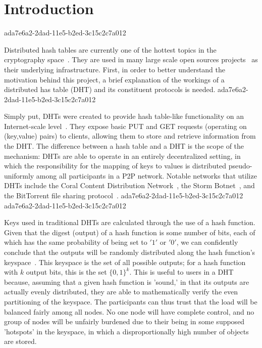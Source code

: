 \documentclass[12pt]{article}
\begin{document}
\section{Introduction}
ada7e6a2-2dad-11e5-b2ed-3c15c2c7a012\par Distributed hash tables are currently one of the hottest topics in the cryptography space~\cite{Stoica:2001dj,Rowstron:2001ea,Ratnasamy:2001wn}. They are used in many large scale open sources projects~\cite{Freitas:2013tb,Xu:2010vs,Perfitt:2010fh} as their underlying infrastructure. First, in order to better understand the motivation behind this project, a brief explanation of the workings of a distributed has table (DHT) and its constituent protocols is needed.
ada7e6a2-2dad-11e5-b2ed-3c15c2c7a012
\par Simply put, DHTs were created to provide hash table-like functionality on an Internet-scale level~\cite{Ratnasamy:2001wn}. They expose basic PUT and GET requests (operating on (key,value) pairs) to clients, allowing them to store and retrieve information from the DHT. The difference between a hash table and a DHT is the scope of the mechanism: DHTs are able to operate in an entirely decentralized setting, in which the responsibility for the mapping of keys to values is distributed pseudo-uniformly among all participants in a P2P network. Notable networks that utilize DHTs include the Coral Content Distribution Network~\cite{Freedman:2004vb}, the Storm Botnet~\cite{Holz:2008uk}, and the BitTorrent file sharing protocol~\cite{Cohen:y1_8mBnw}.
ada7e6a2-2dad-11e5-b2ed-3c15c2c7a012
ada7e6a2-2dad-11e5-b2ed-3c15c2c7a012\par Keys used in traditional DHTs are calculated through the use of a hash function. Given that the digest (output) of a hash function is some number of bits, each of which has the same probability of being set to $'1'$ or $'0'$, we can confidently conclude that the outputs will be randomly distributed along the hash function's keyspace~. This keyspace is the set of all possible outputs; for a hash function with $k$ output bits, this is the set $\{0,1\}^k$. This is useful to users in a DHT because, assuming that a given hash function is 'sound,' in that its outputs are actually evenly distributed, they are able to mathematically verify the even partitioning of the keyspace. The participants can thus trust that the load will be balanced fairly among all nodes. No one node will have complete control, and no group of nodes will be unfairly burdened due to their being in some supposed 'hotspots' in the keyspace, in which a disproportionally high number of objects are stored.~
\end{document}
